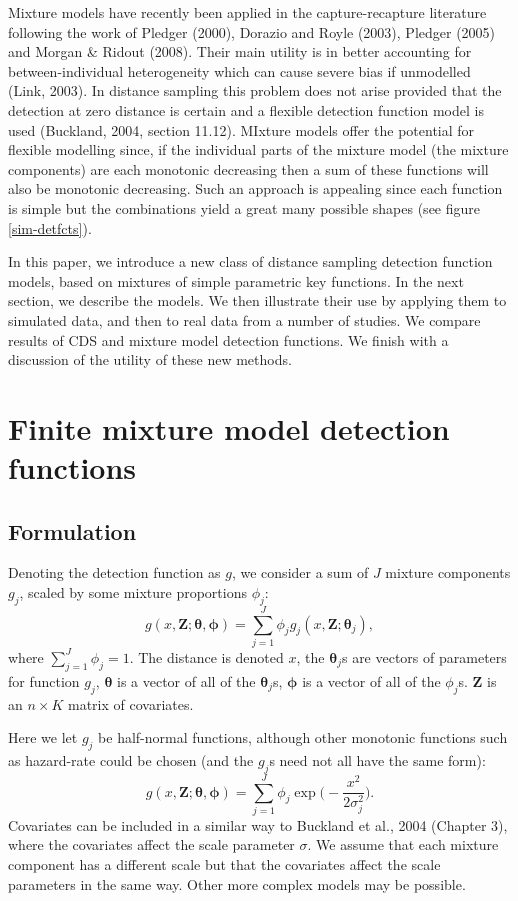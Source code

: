 \documentclass[useAMS,referee, usegraphicx]{biom}
\begin{document}
Mixture models have recently been applied in the capture-recapture literature following the work of Pledger (2000), Dorazio and Royle (2003), Pledger (2005) and Morgan \& Ridout (2008). Their main utility is in better accounting for between-individual heterogeneity which can cause severe bias if unmodelled (Link, 2003). In distance sampling this problem does not arise provided that the detection at zero distance is certain and a flexible detection function model is used (Buckland, 2004, section 11.12). MIxture models offer the potential for flexible modelling since, if the individual parts of the mixture model (the mixture components) are each monotonic decreasing then a sum of these functions will also be monotonic decreasing. Such an approach is appealing since each function is simple but the combinations yield a great many possible shapes (see figure \ref{sim-detfcts}).

In this paper, we introduce a new class of distance sampling detection function models, based on mixtures of simple parametric key functions.  In the next section, we describe the models.  We then illustrate their use by applying them to simulated data, and then to real data from a number of studies.  We compare results of CDS and mixture model detection functions.  We finish with a discussion of the utility of these new methods.

\section{Finite mixture model detection functions}

\subsection{Formulation}
\label{s:detfcts}

Denoting the detection function as $g$, we consider a sum of $J$ mixture components $g_j$, scaled by some mixture proportions $\phi_j$:
\begin{equation*}
g(x,\mathbf{Z}; \bm{\theta}, \bm{\phi}) = \sum_{j=1}^J \phi_j g_j(x,\mathbf{Z}; \bm{\theta}_j),
\end{equation*}
where $\sum_{j=1}^J \phi_j = 1$. The distance is denoted $x$, the $\bm{\theta}_j$s are vectors of parameters for function $g_j$, $\bm{\theta}$ is a vector of all of the $\bm{\theta}_j$s, $\bm{\phi}$ is a vector of all of the $\phi_j$s. $\mathbf{Z}$ is an $n\times K$ matrix of covariates.

Here we let $g_j$ be half-normal functions, although other monotonic functions such as hazard-rate could be chosen (and the $g_j$s need not all have the same form):
\begin{equation*}
g(x,\mathbf{Z}; \bm{\theta}, \bm{\phi}) = \sum_{j=1}^J \phi_j \exp \Big( - \frac{x^2}{2\sigma_j^2} \Big).
\end{equation*}
Covariates can be included in a similar way to Buckland et al., 2004 (Chapter 3), where the covariates affect the scale parameter $\sigma$. We assume that each mixture component has a different scale but that the covariates affect the scale parameters in the same way. Other more complex models may be possible.
\end{document}
